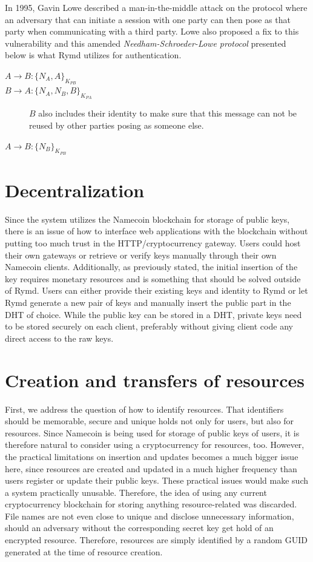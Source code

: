 In 1995, Gavin Lowe described a man-in-the-middle attack on the protocol where an adversary that can initiate a session with one party can then pose as that party when communicating with a third party\cite{Lowe:1995}. Lowe also proposed a fix to this vulnerability and this amended \emph{Needham-Schroeder-Lowe protocol} presented below is what Rymd utilizes for authentication.

\begin{description}
  \item[$A \rightarrow B: \{N_A, A\}_{K_{PB}}$]
  \item[$B \rightarrow A: \{N_A, N_B, B\}_{K_{PA}}$] $B$ also includes their identity to make sure that this message can not be reused by other parties posing as someone else.
  \item[$A \rightarrow B: \{N_B\}_{K_{PB}}$]
\end{description}

\section{Decentralization}
Since the system utilizes the Namecoin blockchain for storage of public keys, there is an issue of how to interface web applications with the blockchain without putting too much trust in the HTTP/cryptocurrency gateway. Users could host their own gateways or retrieve or verify keys manually through their own Namecoin clients. Additionally, as previously stated, the initial insertion of the key requires monetary resources and is something that should be solved outside of Rymd. Users can either provide their existing keys and identity to Rymd or let Rymd generate a new pair of keys and manually insert the public part in the DHT of choice. While the public key can be stored in a DHT, private keys need to be stored securely on each client, preferably without giving client code any direct access to the raw keys.

\section{Creation and transfers of resources}
\label{sec:creationofresources}
First, we address the question of how to identify resources. That identifiers should be memorable, secure and unique holds not only for users, but also for resources. Since Namecoin is being used for storage of public keys of users, it is therefore natural to consider using a cryptocurrency for resources, too. However, the practical limitations on insertion and updates becomes a much bigger issue here, since resources are created and updated in a much higher frequency than users register or update their public keys. These practical issues would make such a system practically unusable. Therefore, the idea of using any current cryptocurrency blockchain for storing anything resource-related was discarded. File names are not even close to unique and disclose unnecessary information, should an adversary without the corresponding secret key get hold of an encrypted resource. Therefore, resources are simply identified by a random GUID generated at the time of resource creation.

